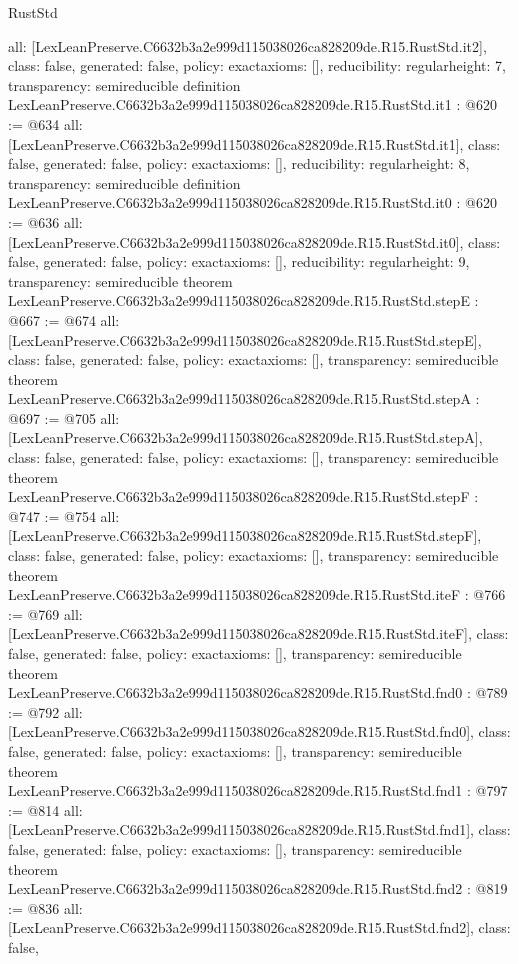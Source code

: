 \begin{lexlean}{RustStd}
\begin{coremodule}
{  all: [LexLeanPreserve.C6632b3a2e999d115038026ca828209de.R15.RustStd.it2],
  class: false,
  generated: false,
  policy: exact{axioms: []},
  reducibility: regular{height: 7},
  transparency: semireducible
}
definition LexLeanPreserve.C6632b3a2e999d115038026ca828209de.R15.RustStd.it1 : @620 := @634 {
  all: [LexLeanPreserve.C6632b3a2e999d115038026ca828209de.R15.RustStd.it1],
  class: false,
  generated: false,
  policy: exact{axioms: []},
  reducibility: regular{height: 8},
  transparency: semireducible
}
definition LexLeanPreserve.C6632b3a2e999d115038026ca828209de.R15.RustStd.it0 : @620 := @636 {
  all: [LexLeanPreserve.C6632b3a2e999d115038026ca828209de.R15.RustStd.it0],
  class: false,
  generated: false,
  policy: exact{axioms: []},
  reducibility: regular{height: 9},
  transparency: semireducible
}
theorem LexLeanPreserve.C6632b3a2e999d115038026ca828209de.R15.RustStd.stepE : @667 := @674 {
  all: [LexLeanPreserve.C6632b3a2e999d115038026ca828209de.R15.RustStd.stepE],
  class: false,
  generated: false,
  policy: exact{axioms: []},
  transparency: semireducible
}
theorem LexLeanPreserve.C6632b3a2e999d115038026ca828209de.R15.RustStd.stepA : @697 := @705 {
  all: [LexLeanPreserve.C6632b3a2e999d115038026ca828209de.R15.RustStd.stepA],
  class: false,
  generated: false,
  policy: exact{axioms: []},
  transparency: semireducible
}
theorem LexLeanPreserve.C6632b3a2e999d115038026ca828209de.R15.RustStd.stepF : @747 := @754 {
  all: [LexLeanPreserve.C6632b3a2e999d115038026ca828209de.R15.RustStd.stepF],
  class: false,
  generated: false,
  policy: exact{axioms: []},
  transparency: semireducible
}
theorem LexLeanPreserve.C6632b3a2e999d115038026ca828209de.R15.RustStd.iteF : @766 := @769 {
  all: [LexLeanPreserve.C6632b3a2e999d115038026ca828209de.R15.RustStd.iteF],
  class: false,
  generated: false,
  policy: exact{axioms: []},
  transparency: semireducible
}
theorem LexLeanPreserve.C6632b3a2e999d115038026ca828209de.R15.RustStd.fnd0 : @789 := @792 {
  all: [LexLeanPreserve.C6632b3a2e999d115038026ca828209de.R15.RustStd.fnd0],
  class: false,
  generated: false,
  policy: exact{axioms: []},
  transparency: semireducible
}
theorem LexLeanPreserve.C6632b3a2e999d115038026ca828209de.R15.RustStd.fnd1 : @797 := @814 {
  all: [LexLeanPreserve.C6632b3a2e999d115038026ca828209de.R15.RustStd.fnd1],
  class: false,
  generated: false,
  policy: exact{axioms: []},
  transparency: semireducible
}
theorem LexLeanPreserve.C6632b3a2e999d115038026ca828209de.R15.RustStd.fnd2 : @819 := @836 {
  all: [LexLeanPreserve.C6632b3a2e999d115038026ca828209de.R15.RustStd.fnd2],
  class: false,
}
\end{coremodule}
\end{lexlean}
